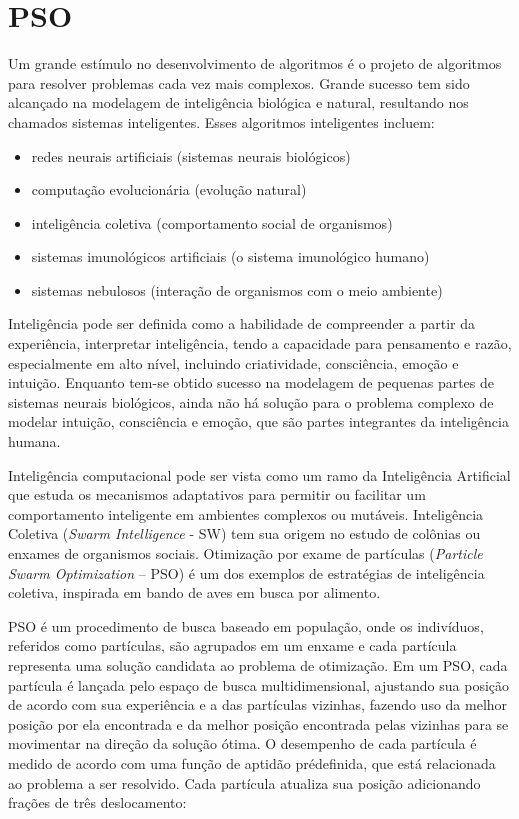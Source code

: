 \chapter{PSO}

Um grande estímulo no desenvolvimento de algoritmos é o projeto de algoritmos para resolver problemas cada vez mais complexos. Grande sucesso tem sido alcançado na modelagem de inteligência biológica e natural, resultando nos chamados sistemas inteligentes. Esses algoritmos inteligentes incluem:

\begin{itemize}
    \item redes neurais artificiais (sistemas neurais biológicos)
    \item computação evolucionária (evolução natural)
    \item inteligência coletiva (comportamento social de organismos)
    \item sistemas imunológicos artificiais (o sistema imunológico humano)
    \item sistemas nebulosos (interação de organismos com o meio ambiente)
\end{itemize}

Inteligência pode ser definida como a habilidade de compreender a partir da experiência, interpretar inteligência, tendo a capacidade para pensamento e razão, especialmente em alto nível, incluindo criatividade, consciência, emoção e intuição. Enquanto tem-se obtido sucesso na modelagem de pequenas partes de sistemas neurais biológicos, ainda não há solução para o problema complexo de modelar intuição, consciência e emoção, que são partes integrantes da inteligência humana.

Inteligência computacional \cite{bib:engelbrecht2007} pode ser vista como um ramo da Inteligência Artificial que estuda os mecanismos adaptativos para permitir ou facilitar um comportamento inteligente em ambientes complexos ou mutáveis. Inteligência Coletiva (\textit{Swarm Intelligence} - SW) tem sua origem no estudo de colônias ou enxames de organismos sociais. Otimização por exame de partículas (\textit{Particle Swarm Optimization} – PSO) \cite{bib:kennedyeberhart1995} é um dos exemplos de estratégias de inteligência coletiva, inspirada em bando de aves em busca por alimento.

PSO é um procedimento de busca baseado em população, onde os indivíduos, referidos como partículas, são agrupados em um enxame e cada partícula representa uma solução candidata ao problema de otimização. Em um PSO, cada partícula é lançada pelo espaço de busca multidimensional, ajustando sua posição de acordo com sua experiência e a das partículas vizinhas, fazendo uso da melhor posição por ela encontrada e da melhor posição encontrada pelas vizinhas para se movimentar na direção da solução ótima. O desempenho de cada partícula é medido de acordo com uma função de aptidão prédefinida, que está relacionada ao problema a ser resolvido. Cada partícula atualiza sua posição adicionando frações de três deslocamento:

